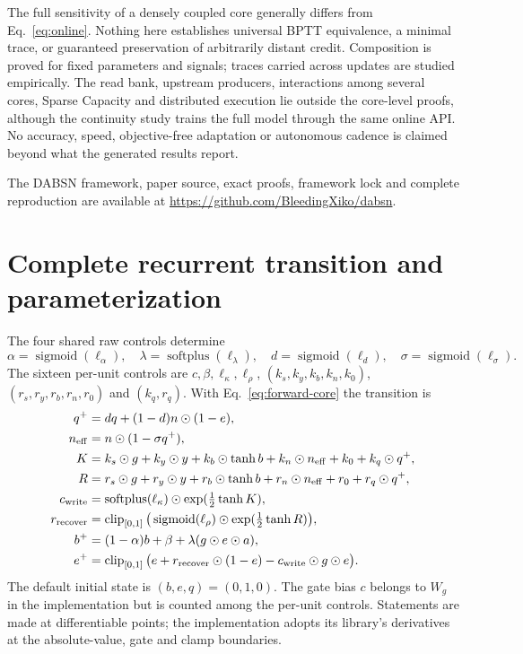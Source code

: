 \documentclass[11pt]{article}
\theoremstyle{definition}
\newcommand{\sg}{\operatorname{sigmoid}}
\newcommand{\spplus}{\operatorname{softplus}}
\newcommand{\clip}{\operatorname{clip}_{[0,1]}}
\newcommand{\Had}{\odot}
\begin{document}
The full sensitivity of a densely coupled core generally differs from
Eq.~\eqref{eq:online}. Nothing here establishes universal BPTT equivalence, a
minimal trace, or guaranteed preservation of arbitrarily distant credit.
Composition is proved for fixed parameters and signals; traces carried across
updates are studied empirically. The read bank, upstream producers, interactions
among several cores, Sparse Capacity and distributed execution lie outside the
core-level proofs, although the continuity study trains the full model through the
same online API. No accuracy, speed, objective-free adaptation or autonomous
cadence is claimed beyond what the generated results report.

The DABSN framework, paper source, exact proofs, framework lock and complete
reproduction are available at \url{https://github.com/BleedingXiko/dabsn}.

\appendix
\section{Complete recurrent transition and parameterization}
\label{app:recurrence}

The four shared raw controls determine
\begin{equation}
 \alpha=\sg(\ell_\alpha),\quad\lambda=\spplus(\ell_\lambda),\quad
 d=\sg(\ell_d),\quad\sigma=\sg(\ell_\sigma).
\end{equation}
The sixteen per-unit controls are $c,\beta,\ell_\kappa,\ell_\rho$,
$(k_s,k_y,k_b,k_n,k_0)$, $(r_s,r_y,r_b,r_n,r_0)$ and $(k_q,r_q)$. With
Eq.~\eqref{eq:forward-core} the transition is
\begin{align}
 q^+&=d q+(1-d)n\Had(1-e),\\
 n_{\rm eff}&=n\Had(1-\sigma q^+),\\
 K&=k_s\Had g+k_y\Had y+k_b\Had\tanh b+k_n\Had n_{\rm eff}+k_0+k_q\Had q^+,\\
 R&=r_s\Had g+r_y\Had y+r_b\Had\tanh b+r_n\Had n_{\rm eff}+r_0+r_q\Had q^+,\\
 c_{\rm write}&=\spplus(\ell_\kappa)\Had\exp(\tfrac12\tanh K),\\
 r_{\rm recover}&=\clip\big(\sg(\ell_\rho)\Had\exp(\tfrac12\tanh R)\big),\\
 b^+&=(1-\alpha)b+\beta+\lambda(g\Had e\Had a),\\
 e^+&=\clip\big(e+r_{\rm recover}\Had(1-e)-c_{\rm write}\Had g\Had e\big).
 \label{eq:complete}
\end{align}
The default initial state is $(b,e,q)=(0,1,0)$. The gate bias $c$ belongs to $W_g$
in the implementation but is counted among the per-unit controls. Statements are
made at differentiable points; the implementation adopts its library's derivatives
at the absolute-value, gate and clamp boundaries.
\end{document}
